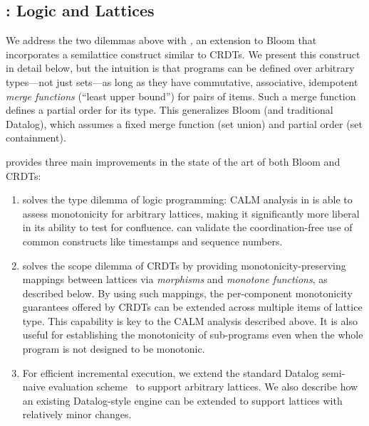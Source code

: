 \subsection{\lang: Logic and Lattices}
We address the two dilemmas above with \emph{\lang,} an extension to Bloom that
incorporates a semilattice construct similar to CRDTs.  We present this construct in detail below, but the intuition is that \lang programs can be defined over arbitrary types---not just sets---as long as they have commutative, associative, idempotent \emph{merge functions} (``least upper bound'') for pairs of items.  Such a merge function defines a partial order  for its type. This
generalizes Bloom (and traditional Datalog), which assumes a fixed merge
function (set union) and partial order (set containment).


\lang provides three main improvements in the state of the art of both Bloom and CRDTs:  
\begin{enumerate}
\item \lang solves the type dilemma of logic programming: CALM analysis in \lang is able to 
 assess monotonicity for arbitrary lattices, making it significantly more liberal in its ability to test for confluence.  \lang can validate the coordination-free use of
  common constructs like timestamps and sequence numbers.

\item {\lang} solves the scope dilemma of CRDTs by providing monotonicity-preserving mappings between lattices via
  \emph{morphisms} and \emph{monotone functions}, as described below.  By using such mappings, the
  per-component monotonicity guarantees offered by CRDTs can be extended across
  multiple items of lattice type.  This capability is key to the CALM
  analysis described above.  It is also useful for
  establishing the monotonicity of sub-programs even when the whole program is
  not designed to be monotonic.

\item For efficient incremental execution, we extend the standard Datalog semi-naive
  evaluation scheme~\cite{Balbin1987} to support arbitrary lattices. We also describe how an existing Datalog-style engine can be
  extended to support lattices with relatively minor changes.
\end{enumerate}

